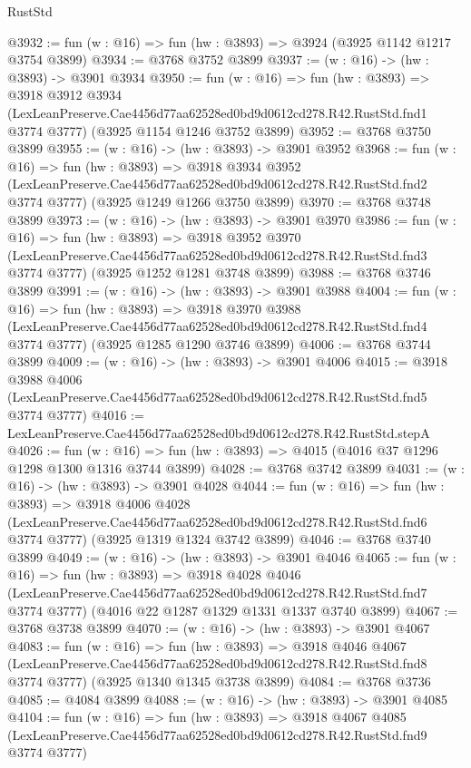 \begin{lexlean}{RustStd}
\begin{coremodule}
@3932 := fun (w : @16) => fun (hw : @3893) => @3924 (@3925 @1142 @1217 @3754 @3899)
@3934 := @3768 @3752 @3899
@3937 := (w : @16) -> (hw : @3893) -> @3901 @3934
@3950 := fun (w : @16) =>
  fun (hw : @3893) =>
  @3918
    @3912
    @3934
    (LexLeanPreserve.Cae4456d77aa62528ed0bd9d0612cd278.R42.RustStd.fnd1 @3774 @3777)
    (@3925 @1154 @1246 @3752 @3899)
@3952 := @3768 @3750 @3899
@3955 := (w : @16) -> (hw : @3893) -> @3901 @3952
@3968 := fun (w : @16) =>
  fun (hw : @3893) =>
  @3918
    @3934
    @3952
    (LexLeanPreserve.Cae4456d77aa62528ed0bd9d0612cd278.R42.RustStd.fnd2 @3774 @3777)
    (@3925 @1249 @1266 @3750 @3899)
@3970 := @3768 @3748 @3899
@3973 := (w : @16) -> (hw : @3893) -> @3901 @3970
@3986 := fun (w : @16) =>
  fun (hw : @3893) =>
  @3918
    @3952
    @3970
    (LexLeanPreserve.Cae4456d77aa62528ed0bd9d0612cd278.R42.RustStd.fnd3 @3774 @3777)
    (@3925 @1252 @1281 @3748 @3899)
@3988 := @3768 @3746 @3899
@3991 := (w : @16) -> (hw : @3893) -> @3901 @3988
@4004 := fun (w : @16) =>
  fun (hw : @3893) =>
  @3918
    @3970
    @3988
    (LexLeanPreserve.Cae4456d77aa62528ed0bd9d0612cd278.R42.RustStd.fnd4 @3774 @3777)
    (@3925 @1285 @1290 @3746 @3899)
@4006 := @3768 @3744 @3899
@4009 := (w : @16) -> (hw : @3893) -> @3901 @4006
@4015 := @3918
    @3988
    @4006
    (LexLeanPreserve.Cae4456d77aa62528ed0bd9d0612cd278.R42.RustStd.fnd5 @3774 @3777)
@4016 := LexLeanPreserve.Cae4456d77aa62528ed0bd9d0612cd278.R42.RustStd.stepA
@4026 := fun (w : @16) => fun (hw : @3893) => @4015 (@4016 @37 @1296 @1298 @1300 @1316 @3744 @3899)
@4028 := @3768 @3742 @3899
@4031 := (w : @16) -> (hw : @3893) -> @3901 @4028
@4044 := fun (w : @16) =>
  fun (hw : @3893) =>
  @3918
    @4006
    @4028
    (LexLeanPreserve.Cae4456d77aa62528ed0bd9d0612cd278.R42.RustStd.fnd6 @3774 @3777)
    (@3925 @1319 @1324 @3742 @3899)
@4046 := @3768 @3740 @3899
@4049 := (w : @16) -> (hw : @3893) -> @3901 @4046
@4065 := fun (w : @16) =>
  fun (hw : @3893) =>
  @3918
    @4028
    @4046
    (LexLeanPreserve.Cae4456d77aa62528ed0bd9d0612cd278.R42.RustStd.fnd7 @3774 @3777)
    (@4016 @22 @1287 @1329 @1331 @1337 @3740 @3899)
@4067 := @3768 @3738 @3899
@4070 := (w : @16) -> (hw : @3893) -> @3901 @4067
@4083 := fun (w : @16) =>
  fun (hw : @3893) =>
  @3918
    @4046
    @4067
    (LexLeanPreserve.Cae4456d77aa62528ed0bd9d0612cd278.R42.RustStd.fnd8 @3774 @3777)
    (@3925 @1340 @1345 @3738 @3899)
@4084 := @3768 @3736
@4085 := @4084 @3899
@4088 := (w : @16) -> (hw : @3893) -> @3901 @4085
@4104 := fun (w : @16) =>
  fun (hw : @3893) =>
  @3918
    @4067
    @4085
    (LexLeanPreserve.Cae4456d77aa62528ed0bd9d0612cd278.R42.RustStd.fnd9 @3774 @3777)

\end{coremodule}
\end{lexlean}
